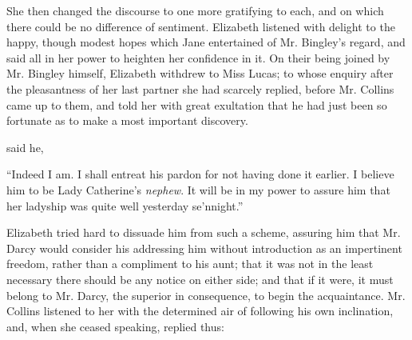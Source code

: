 She then changed the discourse to one more gratifying to each, and on which there could be no difference of sentiment. Elizabeth listened with delight to the happy, though modest hopes which Jane entertained of Mr. Bingley's regard, and said all in her power to heighten her confidence in it. On their being joined by Mr. Bingley himself, Elizabeth withdrew to Miss Lucas; to whose enquiry after the pleasantness of her last partner she had scarcely replied, before Mr. Collins came up to them, and told her with great exultation that he had just been so fortunate as to make a most important discovery.

 said he, 


“Indeed I am. I shall entreat his pardon for not having done it earlier. I believe him to be Lady Catherine's {\em nephew}. It will be in my power to assure him that her ladyship was quite well yesterday se'nnight.”

Elizabeth tried hard to dissuade him from such a scheme, assuring him that Mr. Darcy would consider his addressing him without introduction as an impertinent freedom, rather than a compliment to his aunt; that it was not in the least necessary there should be any notice on either side; and that if it were, it must belong to Mr. Darcy, the superior in consequence, to begin the acquaintance. Mr. Collins listened to her with the determined air of following his own inclination, and, when she ceased speaking, replied thus:

